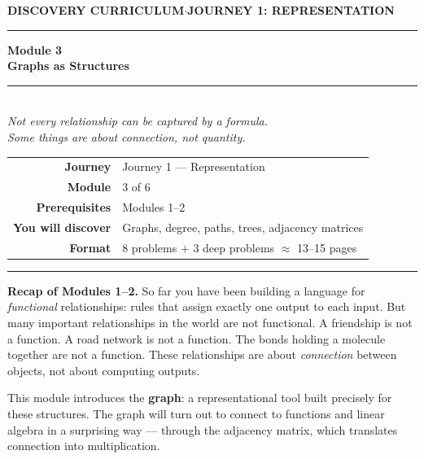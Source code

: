 \documentclass[12pt, a4paper]{article}
\newcounter{problem}
\begin{document}
\thispagestyle{empty}
\begin{center}
{\small\color{MidBlue}\textbf{DISCOVERY CURRICULUM}\quad$\cdot$\quad\textbf{JOURNEY 1: REPRESENTATION}}
\vspace{0.6cm}

{\color{NavyBlue}\rule{\linewidth}{2pt}}
\vspace{0.5cm}

{\Huge\bfseries\color{NavyBlue}Module 3}\\[0.3cm]
{\LARGE\bfseries\color{MidBlue}Graphs as Structures}\\[0.4cm]
{\color{Gold}\rule{0.4\linewidth}{1.2pt}}\\[0.4cm]
{\large\itshape\color{DarkGrey}Not every relationship can be captured by a formula.\\[0.15cm]
Some things are about \emph{connection}, not quantity.}

\vspace{1cm}
\begin{tabular}{rl}
\color{DarkGrey}\textbf{Journey}           & Journey 1 --- Representation \\[4pt]
\color{DarkGrey}\textbf{Module}            & 3 of 6 \\[4pt]
\color{DarkGrey}\textbf{Prerequisites}     & Modules 1--2 \\[4pt]
\color{DarkGrey}\textbf{You will discover} & Graphs, degree, paths, trees, adjacency matrices \\[4pt]
\color{DarkGrey}\textbf{Format}            & 8 problems $+$ 3 deep problems $\approx$ 13--15 pages \\
\end{tabular}
\vspace{1cm}

{\color{NavyBlue}\rule{\linewidth}{2pt}}
\end{center}

\vspace{0.5cm}
\noindent\textbf{Recap of Modules 1--2.}
So far you have been building a language for \emph{functional} relationships: rules that assign exactly one output to each input. But many important relationships in the world are not functional. A friendship is not a function. A road network is not a function. The bonds holding a molecule together are not a function. These relationships are about \emph{connection} between objects, not about computing outputs.

\medskip
This module introduces the \textbf{graph}: a representational tool built precisely for these structures. The graph will turn out to connect to functions and linear algebra in a surprising way --- through the adjacency matrix, which translates connection into multiplication.
\end{document}
